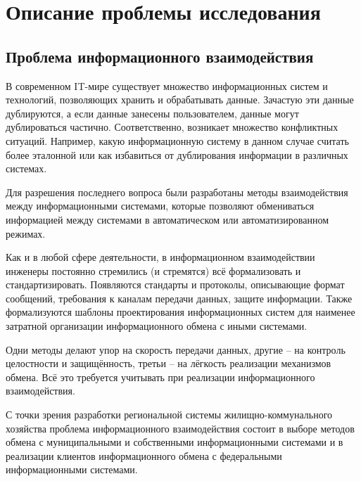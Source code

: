 \section{Описание проблемы исследования}

\subsection{Проблема информационного взаимодействия}


В современном IT-мире существует множество информационных систем и технологий, позволяющих хранить и обрабатывать данные.
Зачастую эти данные дублируются, а если данные занесены пользователем, данные могут дублироваться частично.
Соответственно, возникает множество конфликтных ситуаций.
Например, какую информационную систему в данном случае считать более эталонной или как избавиться от дублирования информации в различных системах.

Для разрешения последнего вопроса были разработаны методы взаимодействия между информационными системами, которые позволяют обмениваться информацией между системами в автоматическом или автоматизированном режимах.

Как и в любой сфере деятельности, в информационном взаимодействии инженеры постоянно стремились (и стремятся) всё формализовать и стандартизировать.
Появляются стандарты и протоколы, описывающие формат сообщений, требования к каналам передачи данных, защите информации.
Также формализуются шаблоны проектирования информационных систем для наименее затратной организации информационного обмена с иными системами.

Одни методы делают упор на скорость передачи данных, другие -- на контроль целостности и защищённость, третьи -- на лёгкость реализации механизмов обмена.
Всё это требуется учитывать при реализации информационного взаимодействия.

С точки зрения разработки региональной системы жилищно-коммунального хозяйства проблема информационного взаимодействия состоит в выборе методов обмена с муниципальными и собственными информационными системами и в реализации клиентов информационного обмена с федеральными информационными системами. 



